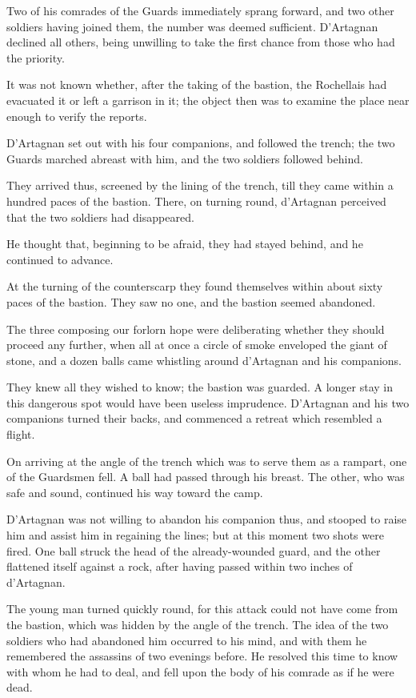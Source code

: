 Two of his comrades of the Guards immediately sprang forward, and two other soldiers having joined them, the number was deemed sufficient. D'Artagnan declined all others, being unwilling to take the first chance from those who had the priority. 

It was not known whether, after the taking of the bastion, the Rochellais had evacuated it or left a garrison in it; the object then was to examine the place near enough to verify the reports. 

D'Artagnan set out with his four companions, and followed the trench; the two Guards marched abreast with him, and the two soldiers followed behind. 

They arrived thus, screened by the lining of the trench, till they came within a hundred paces of the bastion. There, on turning round, d'Artagnan perceived that the two soldiers had disappeared. 

He thought that, beginning to be afraid, they had stayed behind, and he continued to advance. 

At the turning of the counterscarp they found themselves within about sixty paces of the bastion. They saw no one, and the bastion seemed abandoned. 

The three composing our forlorn hope were deliberating whether they should proceed any further, when all at once a circle of smoke enveloped the giant of stone, and a dozen balls came whistling around d'Artagnan and his companions. 

They knew all they wished to know; the bastion was guarded. A longer stay in this dangerous spot would have been useless imprudence. D'Artagnan and his two companions turned their backs, and commenced a retreat which resembled a flight. 

On arriving at the angle of the trench which was to serve them as a rampart, one of the Guardsmen fell. A ball had passed through his breast. The other, who was safe and sound, continued his way toward the camp. 

D'Artagnan was not willing to abandon his companion thus, and stooped to raise him and assist him in regaining the lines; but at this moment two shots were fired. One ball struck the head of the already-wounded guard, and the other flattened itself against a rock, after having passed within two inches of d'Artagnan. 

The young man turned quickly round, for this attack could not have come from the bastion, which was hidden by the angle of the trench. The idea of the two soldiers who had abandoned him occurred to his mind, and with them he remembered the assassins of two evenings before. He resolved this time to know with whom he had to deal, and fell upon the body of his comrade as if he were dead. 

